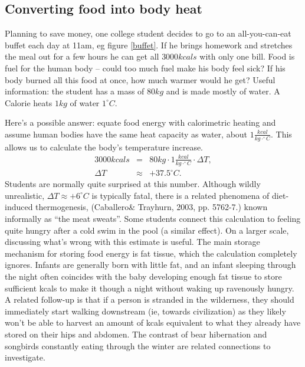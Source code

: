 \documentclass[jou]{apa7}
\newcommand{\bea}{\begin{eqnarray}}
\newcommand{\eea}{\end{eqnarray}}
\newcommand{\degC}{^{\circ}C}
\begin{document}
\subsection{Converting food into body heat}
Planning to save money, one college student decides to go to an all-you-can-eat buffet each day at 11am, eg figure \ref{buffet}.  If he brings homework and stretches the meal out for a few hours he can get all $3000kcals$ with only one bill.  Food is fuel for the human body -- could too much fuel make his body feel sick? If his body burned all this food at once, how much warmer would he get? 
Useful information: the student has a mass of $80kg$ and is made mostly of water.  A Calorie heats $1 kg$ of water $1^{\circ}C$. 

Here's a possible answer:
equate food energy with calorimetric heating and assume human bodies have the same heat capacity as water, about $1\frac{kcal}{kg\cdot\degC}$. This allows us to calculate the body's temperature increase.
\bea
3000kcals &=& 80kg\cdot1 \frac{kcal}{kg\cdot \degC}\cdot\Delta T ,  \\
\Delta T &\approx& +37.5\degC . 
\eea
Students are normally quite surprised at this number.  Although wildly unrealistic, $\Delta T \approx +6\degC$ is typically fatal, there is a related phenomena of diet-induced thermogenesis,
(Caballero\& Trayhurn, 2003, pp. 5762-7.)
known informally as ``the meat sweats''. Some students connect this calculation to feeling quite hungry after a cold swim in the pool (a similar effect).  On a larger scale, discussing what's wrong with this estimate is useful.  The main storage mechanism for storing food energy is fat tissue, which the calculation completely ignores.  Infants are generally born with little fat, and an infant sleeping through the night often coincides with the baby developing enough fat tissue to store sufficient kcals to make it though a night without waking up ravenously hungry.  A related follow-up is that if a person is stranded in the wilderness, they should immediately start walking downstream (ie, towards civilization) as they likely won't be able to harvest an amount of kcals equivalent to what they already have stored on their hips and abdomen.\cite{trout}  The contrast of bear hibernation\cite{fat_bear} and songbirds constantly eating through the winter are related connections to investigate.
\end{document}
